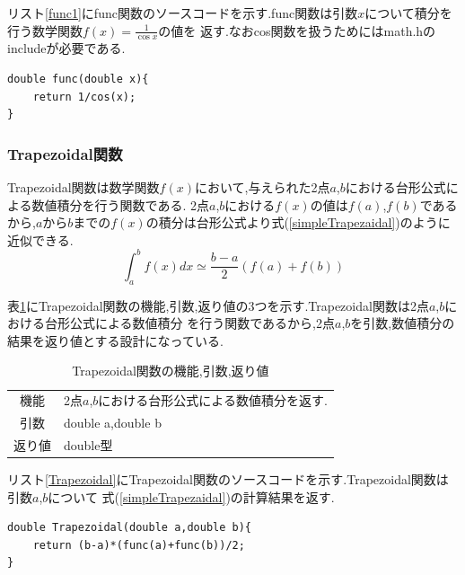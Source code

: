 \documentclass[dvipdfmx]{jarticle}
\begin{document}
    リスト\ref{func1}にfunc関数のソースコードを示す.func関数は引数$x$について積分を行う数学関数$f(x) = \frac{1}{\cos x}$の値を
    返す.なおcos関数を扱うためにはmath.hのincludeが必要である.
    \begin{lstlisting}[basicstyle=\ttfamily\footnotesize, frame=single,label=func1,caption=func関数]
double func(double x){
    return 1/cos(x);
} 
    \end{lstlisting}

    \subsubsection{Trapezoidal関数}
    Trapezoidal関数は数学関数$f(x)$において,与えられた2点$a$,$b$における台形公式による数値積分を行う関数である.
    2点$a$,$b$における$f(x)$の値は$f(a)$,$f(b)$であるから,$a$から$b$までの$f(x)$の積分は台形公式より式(\ref{simpleTrapezaidal})のように
    近似できる.
    \begin{equation}
      \int_a^b f(x) dx \simeq \frac{b-a}{2}(f(a)+f(b))
          \label{simpleTrapezaidal}
        \end{equation}

    表\ref{Trapezoidaltable}にTrapezoidal関数の機能,引数,返り値の3つを示す.Trapezoidal関数は2点$a$,$b$における台形公式による数値積分
    を行う関数であるから,2点$a$,$b$を引数,数値積分の結果を返り値とする設計になっている.

    \begin{table}[H]
      \caption{Trapezoidal関数の機能,引数,返り値}
      \label{Trapezoidaltable}
      \begin{center}
          \begin{tabular}{c|l}\hline
        機能 & 2点$a$,$b$における台形公式による数値積分を返す.\\
        引数 & double a,double b\\
        返り値 & double型 \\ \hline
          \end{tabular}
      \end{center}
      \end{table}

      リスト\ref{Trapezoidal}にTrapezoidal関数のソースコードを示す.Trapezoidal関数は引数$a$,$b$について
      式(\ref{simpleTrapezaidal})の計算結果を返す.
      \begin{lstlisting}[basicstyle=\ttfamily\footnotesize, frame=single,label=Trapezoidal,caption=Trapezoidal関数]
double Trapezoidal(double a,double b){
    return (b-a)*(func(a)+func(b))/2;
}
            \end{lstlisting}
\end{document}
